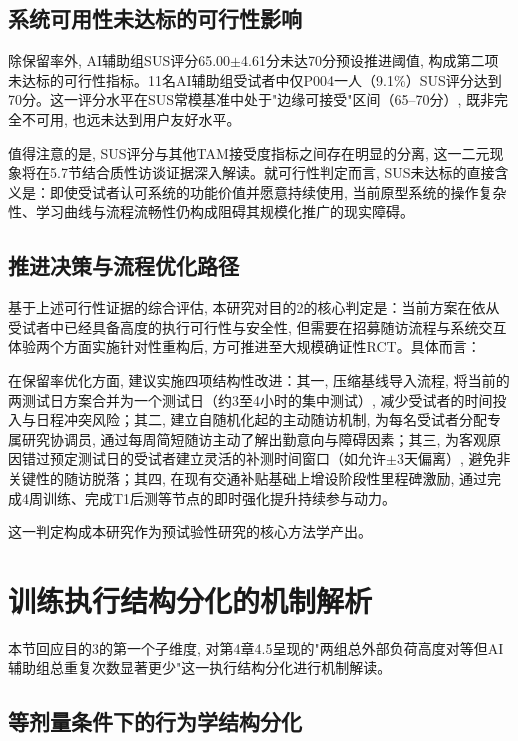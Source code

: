 \subsection{系统可用性未达标的可行性影响}
\label{sec:sus_feasibility}

除保留率外, AI辅助组SUS评分65.00$\pm$4.61分未达70分预设推进阈值, 构成第二项未达标的可行性指标。11名AI辅助组受试者中仅P004一人（9.1\%）SUS评分达到70分。这一评分水平在SUS常模基准中处于"边缘可接受"区间（65--70分）, 既非完全不可用, 也远未达到用户友好水平。

值得注意的是, SUS评分与其他TAM接受度指标之间存在明显的分离, 这一二元现象将在5.7节结合质性访谈证据深入解读。就可行性判定而言, SUS未达标的直接含义是：即使受试者认可系统的功能价值并愿意持续使用, 当前原型系统的操作复杂性、学习曲线与流程流畅性仍构成阻碍其规模化推广的现实障碍。

\subsection{推进决策与流程优化路径}
\label{sec:go_no_go}

基于上述可行性证据的综合评估, 本研究对目的2的核心判定是：当前方案在依从受试者中已经具备高度的执行可行性与安全性, 但需要在招募随访流程与系统交互体验两个方面实施针对性重构后, 方可推进至大规模确证性RCT。具体而言：

在保留率优化方面, 建议实施四项结构性改进：其一, 压缩基线导入流程, 将当前的两测试日方案合并为一个测试日（约3至4小时的集中测试）, 减少受试者的时间投入与日程冲突风险；其二, 建立自随机化起的主动随访机制, 为每名受试者分配专属研究协调员, 通过每周简短随访主动了解出勤意向与障碍因素；其三, 为客观原因错过预定测试日的受试者建立灵活的补测时间窗口（如允许$\pm$3天偏离）, 避免非关键性的随访脱落；其四, 在现有交通补贴基础上增设阶段性里程碑激励, 通过完成4周训练、完成T1后测等节点的即时强化提升持续参与动力。

这一判定构成本研究作为预试验性研究的核心方法学产出。

\section{训练执行结构分化的机制解析}
\label{sec:execution_structure}

本节回应目的3的第一个子维度, 对第4章4.5呈现的"两组总外部负荷高度对等但AI辅助组总重复次数显著更少"这一执行结构分化进行机制解读。

\subsection{等剂量条件下的行为学结构分化}
\label{sec:dose_equivalent}

